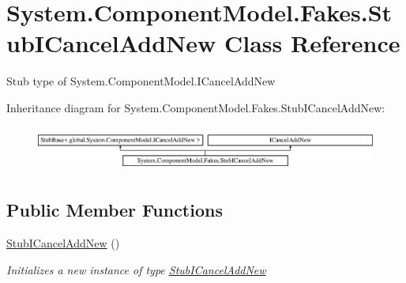\hypertarget{class_system_1_1_component_model_1_1_fakes_1_1_stub_i_cancel_add_new}{\section{System.\-Component\-Model.\-Fakes.\-Stub\-I\-Cancel\-Add\-New Class Reference}
\label{class_system_1_1_component_model_1_1_fakes_1_1_stub_i_cancel_add_new}
}


Stub type of System.\-Component\-Model.\-I\-Cancel\-Add\-New 


Inheritance diagram for System.\-Component\-Model.\-Fakes.\-Stub\-I\-Cancel\-Add\-New\-:\begin{figure}[H]
\begin{center}
\leavevmode
\includegraphics[height=1.505376cm]{class_system_1_1_component_model_1_1_fakes_1_1_stub_i_cancel_add_new}
\end{center}
\end{figure}
\subsection*{Public Member Functions}
\begin{DoxyCompactItemize}
\item 
\hyperlink{class_system_1_1_component_model_1_1_fakes_1_1_stub_i_cancel_add_new_a71030c635a6a43c9ef2566a4bb950c68}{Stub\-I\-Cancel\-Add\-New} ()
\begin{DoxyCompactList}\small\item\em Initializes a new instance of type \hyperlink{class_system_1_1_component_model_1_1_fakes_1_1_stub_i_cancel_add_new}{Stub\-I\-Cancel\-Add\-New}\end{DoxyCompactList}\end{DoxyCompactItemize}
